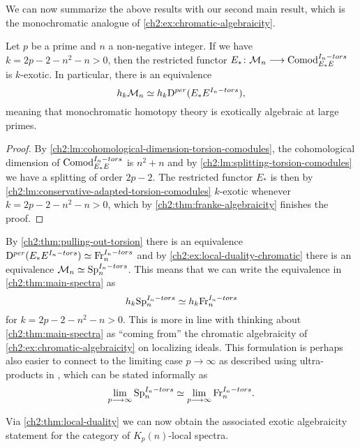 We can now summarize the above results with our second main result, which is the monochromatic analogue of \cref{ch2:ex:chromatic-algebraicity}. 

\begin{theorem}
    \label{ch2:thm:main-spectra}
    Let $p$ be a prime and $n$ a non-negative integer. If we have $k=2p-2-n^2-n>0$, then the restricted functor $E_*\colon \mathcal{M}_{n}\longrightarrow \mathrm{Comod}_{E_*E}^{I_n-tors}$ is $k$-exotic. In particular, there is an equivalence 
    \begin{equation*}
        h_k \mathcal{M}_{n} \simeq h_k\mathrm{D}^{per}(E_*E^{I_n-tors}),
    \end{equation*}
    meaning that monochromatic homotopy theory is exotically algebraic at large primes. 
\end{theorem}
\begin{proof}
    By \cref{ch2:lm:cohomological-dimension-torsion-comodules}, the cohomological dimension of $\mathrm{Comod}_{E_*E}^{I_n-tors}$ is $n^2+n$ and by \cref{ch2:lm:splitting-torsion-comodules} we have a splitting of order $2p-2$. The restricted functor $E_*$ is then by \cref{ch2:lm:conservative-adapted-torsion-comodules} $k$-exotic whenever $k=2p-2-n^2-n>0$, which by \cref{ch2:thm:franke-algebraicity} finishes the proof. 
\end{proof}

\begin{remark}
    \label{ch2:rm:monochromatic-corresponds-to-torsion}
    By \cref{ch2:thm:pulling-out-torsion} there is an equivalence $\mathrm{D}^{per}(E_*E^{I_n-tors})\simeq \mathrm{Fr}_{n}^{I_n-tors}$ and by \cref{ch2:ex:local-duality-chromatic} there is an equivalence $\mathcal{M}_{n}\simeq \mathrm{Sp}_{n}^{I_n-tors}$. This means that we can write the equivalence in \cref{ch2:thm:main-spectra} as 
    $$h_k\mathrm{Sp}_{n}^{I_n-tors}\simeq h_k\mathrm{Fr}_{n}^{I_n-tors}$$
    for $k=2p-2-n^2-n>0$. This is more in line with thinking about \cref{ch2:thm:main-spectra} as ``coming from'' the chromatic algebraicity of \cref{ch2:ex:chromatic-algebraicity} on localizing ideals. This formulation is perhaps also easier to connect to the limiting case $p\to \infty$ as described using ultra-products in \cite{barthel-schlank-stapleton_2021}, which can be stated informally as 
    $$\lim_{p\longrightarrow \infty} \mathrm{Sp}_{n}^{I_n-tors}\simeq \lim_{p\longrightarrow \infty} \mathrm{Fr}_{n}^{I_n-tors}.$$
\end{remark}


Via \cref{ch2:thm:local-duality} we can now obtain the associated exotic algebraicity statement for the category of $K_p(n)$-local spectra.

